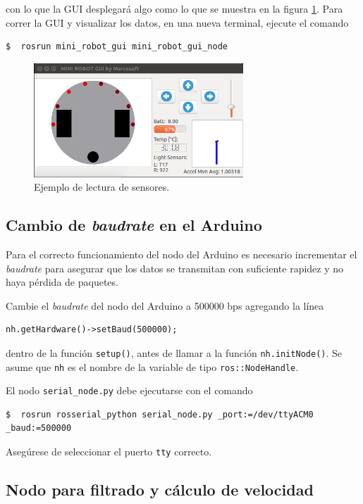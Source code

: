 \documentclass[letterpaper,12pt]{article}
\begin{document}
con lo que la GUI desplegará algo como lo que se muestra en la figura \ref{fig:Example}. Para correr la GUI y visualizar los datos, en una nueva terminal, ejecute el comando

\begin{lstlisting}[language=bash]
$  rosrun mini_robot_gui mini_robot_gui_node
\end{lstlisting}

\begin{figure}
  \centering
  \includegraphics[width=0.7\textwidth]{Figures/SensorExample.png}
  \caption{Ejemplo de lectura de sensores.}
  \label{fig:Example}
\end{figure}

\subsection{Cambio de \textit{baudrate} en el Arduino}
Para el correcto funcionamiento del nodo del Arduino es necesario incrementar el \textit{baudrate} para asegurar que los datos se transmitan con suficiente rapidez y no haya pérdida de paquetes. 

Cambie el \textit{baudrate} del nodo del Arduino a 500000 bps agregando la línea 
\begin{lstlisting}
nh.getHardware()->setBaud(500000);
\end{lstlisting}
dentro de la función \texttt{setup()}, antes de llamar a la función \texttt{nh.initNode()}. Se asume que \texttt{nh} es el nombre de la variable de tipo \texttt{ros::NodeHandle}.

El nodo \texttt{serial\_node.py} debe ejecutarse con el comando
\begin{lstlisting}
$  rosrun rosserial_python serial_node.py _port:=/dev/ttyACM0 _baud:=500000
\end{lstlisting}
Asegúrese de seleccionar el puerto \texttt{tty} correcto. 

\subsection{Nodo para filtrado y cálculo de velocidad}
\end{document}
